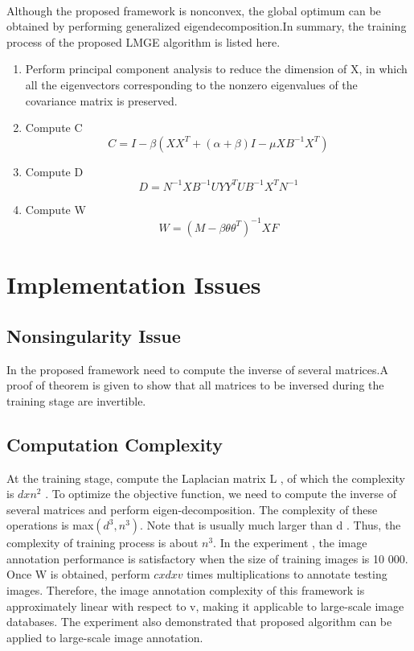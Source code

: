 \documentclass[a4paper,11pt]{report}
\begin{document}
\paragraph{}Although the proposed framework
 is nonconvex, the global optimum can be
obtained by performing generalized eigendecomposition.In summary, the training process of the
proposed LMGE algorithm is listed here.
\begin{enumerate}
\item Perform principal component analysis to reduce
the dimension of X, in which all the eigenvectors
corresponding to the nonzero eigenvalues of the
covariance matrix is preserved.
\item Compute C 
\begin{equation}
C=I-\beta(XX^T +(\alpha + \beta)I -\mu XB^{-1}X^T)
\end{equation}
\item Compute D
\begin{equation}
D=N^{-1}XB^{-1}UYY^TUB^{-1}X^TN^{-1}
\end{equation}
\item Compute W
\begin{equation}
W=(M-\beta\theta\theta^T)^{-1}XF
\end{equation}
\end{enumerate} 

\section{Implementation Issues
} 
\subsection{Nonsingularity Issue} In the proposed framework need to
compute the inverse of several matrices.A proof of theorem is given to show that all matrices to be inversed during the training
stage are invertible.
\subsection{Computation Complexity}
 At the training
stage,  compute the Laplacian matrix L , of which
the complexity is $dxn^2$ . To optimize the objective function,
we need to compute the inverse of several matrices and perform
eigen-decomposition. The complexity of these operations
is max$(d^3,n^3) $. Note that is usually much larger than d . Thus,
the complexity of training process is about $n^3$. In
the experiment , the image annotation performance is satisfactory
when the size of training images is 10 000. Once W is
obtained,  perform $cxdxv$ times multiplications
to annotate testing images. Therefore, the image annotation
complexity of this framework is approximately linear with respect
to v, making it applicable to large-scale image databases.
The experiment also demonstrated that proposed algorithm can be applied
to large-scale image annotation.
\end{document}
